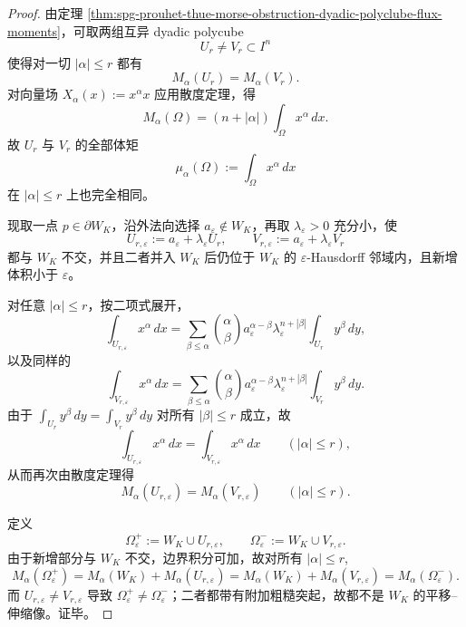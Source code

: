 \begin{proof}
由定理 \ref{thm:spg-prouhet-thue-morse-obstruction-dyadic-polyclube-flux-moments}，可取两组互异 dyadic polycube
\[
U_r\neq V_r\subset I^n
\]
使得对一切 \(|\alpha|\le r\) 都有
\[
M_\alpha(U_r)=M_\alpha(V_r).
\]
对向量场 \(X_\alpha(x):=x^\alpha x\) 应用散度定理，得
\[
M_\alpha(\Omega)=(n+|\alpha|)\int_\Omega x^\alpha\,dx.
\]
故 \(U_r\) 与 \(V_r\) 的全部体矩
\[
\mu_\alpha(\Omega):=\int_\Omega x^\alpha\,dx
\]
在 \(|\alpha|\le r\) 上也完全相同。

现取一点 \(p\in\partial W_K\)，沿外法向选择 \(a_\varepsilon\notin W_K\)，再取 \(\lambda_\varepsilon>0\) 充分小，使
\[
U_{r,\varepsilon}:=a_\varepsilon+\lambda_\varepsilon U_r,
\qquad
V_{r,\varepsilon}:=a_\varepsilon+\lambda_\varepsilon V_r
\]
都与 \(W_K\) 不交，并且二者并入 \(W_K\) 后仍位于 \(W_K\) 的 \(\varepsilon\)-Hausdorff 邻域内，且新增体积小于 \(\varepsilon\)。

对任意 \(|\alpha|\le r\)，按二项式展开，
\[
\int_{U_{r,\varepsilon}}x^\alpha\,dx
=
\sum_{\beta\le \alpha}\binom{\alpha}{\beta}
a_\varepsilon^{\alpha-\beta}\lambda_\varepsilon^{n+|\beta|}
\int_{U_r}y^\beta\,dy,
\]
以及同样的
\[
\int_{V_{r,\varepsilon}}x^\alpha\,dx
=
\sum_{\beta\le \alpha}\binom{\alpha}{\beta}
a_\varepsilon^{\alpha-\beta}\lambda_\varepsilon^{n+|\beta|}
\int_{V_r}y^\beta\,dy.
\]
由于 \(\int_{U_r}y^\beta\,dy=\int_{V_r}y^\beta\,dy\) 对所有 \(|\beta|\le r\) 成立，故
\[
\int_{U_{r,\varepsilon}}x^\alpha\,dx
=
\int_{V_{r,\varepsilon}}x^\alpha\,dx
\qquad(|\alpha|\le r),
\]
从而再次由散度定理得
\[
M_\alpha(U_{r,\varepsilon})=M_\alpha(V_{r,\varepsilon})
\qquad(|\alpha|\le r).
\]

定义
\[
\Omega_\varepsilon^+:=W_K\cup U_{r,\varepsilon},
\qquad
\Omega_\varepsilon^-:=W_K\cup V_{r,\varepsilon}.
\]
由于新增部分与 \(W_K\) 不交，边界积分可加，故对所有 \(|\alpha|\le r\),
\[
M_\alpha(\Omega_\varepsilon^+)
=
M_\alpha(W_K)+M_\alpha(U_{r,\varepsilon})
=
M_\alpha(W_K)+M_\alpha(V_{r,\varepsilon})
=
M_\alpha(\Omega_\varepsilon^-).
\]
而 \(U_{r,\varepsilon}\neq V_{r,\varepsilon}\) 导致 \(\Omega_\varepsilon^+\neq \Omega_\varepsilon^-\)；二者都带有附加粗糙突起，故都不是 \(W_K\) 的平移--伸缩像。证毕。
\end{proof}

